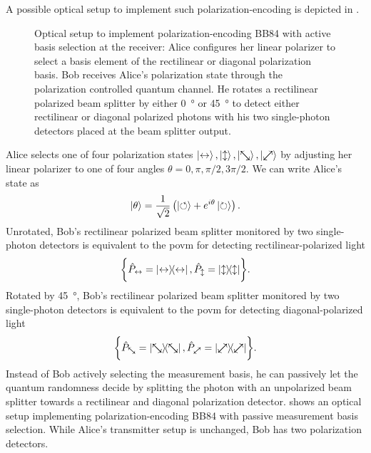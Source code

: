 A possible optical setup to implement such polarization-encoding is depicted in .
\begin{figure}[htb]
	\centering
	
	\caption{Optical setup to implement polarization-encoding BB84 with active basis selection at the receiver: Alice configures her linear polarizer to select a basis element of the rectilinear or diagonal polarization basis. Bob receives Alice's polarization state through the polarization controlled quantum channel. He rotates a rectilinear polarized beam splitter by either \SI{0}{\degree} or \SI{45}{\degree} to detect either rectilinear or diagonal polarized photons with his two single-photon detectors placed at the beam splitter output.}\label{fig:polarization_encoding_active}
\end{figure}
Alice selects one of four polarization states $\ket{\leftrightarrow},\ket{\updownarrow},\ket{\nwsearrow},\ket{\neswarrow}$ by adjusting her linear polarizer to one of four angles $\theta=0,\pi,\pi/2,3\pi/2$.
We can write Alice's state as
\begin{equation}
	\ket{\theta}
	=
	\frac{1}{\sqrt{2}}
	\left(
		\ket{\circlearrowleft}
		+
		e^{i\theta}
		\ket{\circlearrowright}
	\right)
	.
\end{equation}
Unrotated, Bob's rectilinear polarized beam splitter monitored by two single-photon detectors is equivalent to the \gls{povm} for detecting rectilinear-polarized light
\begin{equation}
	\biggl\{
		\hat{P}_{\leftrightarrow}
		=
		\ketbra{\leftrightarrow},
		\hat{P}_{\updownarrow}
		=
		\ketbra{\updownarrow}
	\biggr\}
	.
\end{equation}
Rotated by \SI{45}{\degree}, Bob's rectilinear polarized beam splitter monitored by two single-photon detectors is equivalent to the \gls{povm} for detecting diagonal-polarized light
\begin{equation}
	\biggl\{
		\hat{P}_{\nwsearrow}
		=
		\ketbra{\nwsearrow},
		\hat{P}_{\neswarrow}
		=
		\ketbra{\neswarrow}
	\biggr\}
	.
\end{equation}
Instead of Bob actively selecting the measurement basis, he can passively let the quantum randomness decide by splitting the photon with an unpolarized beam splitter towards a rectilinear and diagonal polarization detector.
 shows an optical setup implementing polarization-encoding BB84 with passive measurement basis selection.
While Alice's transmitter setup is unchanged, Bob has two polarization detectors.
